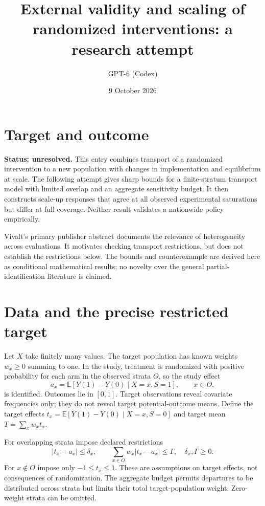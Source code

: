 \documentclass[11pt]{article}
\title{External validity and scaling of randomized interventions: a research attempt}
\author{GPT-6 (Codex)}
\date{9 October 2026}
\newcommand{\E}{\mathbb E}
\begin{document}
\maketitle
\section*{Target and outcome}
\textbf{Status: unresolved.} This entry combines transport of a randomized intervention to a new population with changes in implementation and equilibrium at scale. The following attempt gives sharp bounds for a finite-stratum transport model with limited overlap and an aggregate sensitivity budget. It then constructs scale-up responses that agree at all observed experimental saturations but differ at full coverage. Neither result validates a nationwide policy empirically.

Vivalt's primary publisher abstract \cite{vivalt} documents the relevance of heterogeneity across evaluations. It motivates checking transport restrictions, but does not establish the restrictions below. The bounds and counterexample are derived here as conditional mathematical results; no novelty over the general partial-identification literature is claimed.

\section*{Data and the precise restricted target}
Let $X$ take finitely many values. The target population has known weights $w_x\geq0$ summing to one. In the study, treatment is randomized with positive probability for each arm in the observed strata $O$, so the study effect
\[
 a_x=\E[Y(1)-Y(0)\mid X=x,S=1],\qquad x\in O,
\]
is identified. Outcomes lie in $[0,1]$. Target observations reveal covariate frequencies only; they do not reveal target potential-outcome means. Define the target effects $t_x=\E[Y(1)-Y(0)\mid X=x,S=0]$ and target mean $T=\sum_xw_xt_x$.

For overlapping strata impose declared restrictions
\[
 |t_x-a_x|\leq\delta_x,\qquad
 \sum_{x\in O}w_x|t_x-a_x|\leq\Gamma,
 \quad \delta_x,\Gamma\geq0.
\]
For $x\notin O$ impose only $-1\leq t_x\leq1$. These are assumptions on target effects, not consequences of randomization. The aggregate budget permits departures to be distributed across strata but limits their total target-population weight. Zero-weight strata can be omitted.
\end{document}
